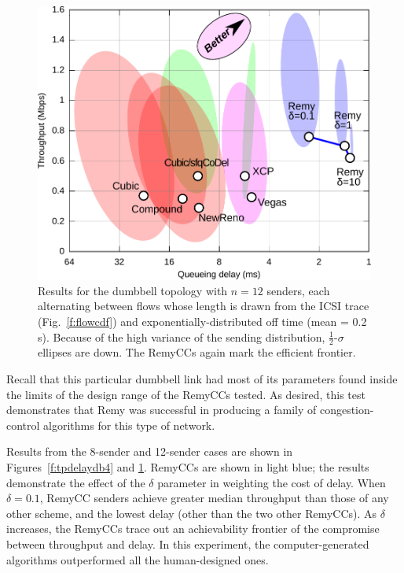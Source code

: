 \begin{figure}
\includegraphics[width=\columnwidth]{eth12-final-flowcdf.pdf}
\caption{Results for the dumbbell topology with $n = 12$ senders, each
  alternating between flows whose length is drawn from the ICSI trace
  (Fig.~\ref{f:flowcdf}) and exponentially-distributed off time (mean
  = 0.2 s). Because of the high variance of the sending distribution,
  $\frac{1}{2}$-$\sigma$ ellipses are down. The RemyCCs again mark
  the efficient frontier.}

\label{f:tpdelaydb8}


\end{figure}

Recall that this particular dumbbell link had most of its parameters
found inside the limits of the design range of the RemyCCs
tested. As desired, this test demonstrates that Remy was successful in
producing a family of congestion-control algorithms for this type of
network.

Results from the 8-sender and 12-sender cases are shown in
Figures~\ref{f:tpdelaydb4} and \ref{f:tpdelaydb8}. RemyCCs are shown
in light blue; the results demonstrate the effect of the $\delta$
parameter in weighting the cost of delay. When $\delta = 0.1$, RemyCC
senders achieve greater median throughput than those of any other scheme,
and the lowest delay (other than the two other RemyCCs). As $\delta$
increases, the RemyCCs trace out an achievability frontier of the
compromise between throughput and delay. In this experiment, the
computer-generated algorithms outperformed all the human-designed ones.

